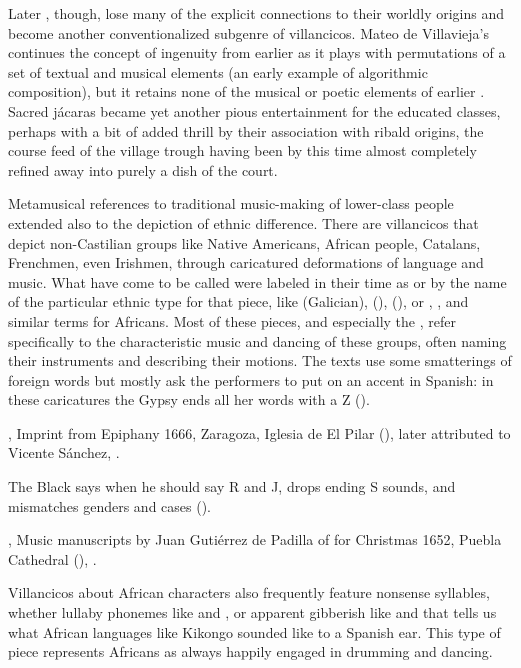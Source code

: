 Later , though, lose many of the explicit connections to their
worldly origins and become another conventionalized subgenre of villancicos.
Mateo de Villavieja's  continues the concept of
ingenuity from earlier  as it plays with permutations of a set of
textual and musical elements (an early example of algorithmic composition), but
it retains none of the musical or poetic elements of earlier .
Sacred jácaras became yet another pious entertainment for the educated classes,
perhaps with a bit of added thrill by their association with ribald origins,
the course feed of the village trough having been by this time almost
completely refined away into purely a dish of the court.

Metamusical references to traditional music-making of lower-class people
extended also to the depiction of ethnic difference.
There are villancicos that depict non-Castilian groups like Native Americans,
African people, Catalans, Frenchmen, even Irishmen, through caricatured
deformations of language and music.
What have come to be called  were labeled in their
time as  or by the name of the particular ethnic
type for that piece, like  (Galician), 
(),  (), or ,
, and similar terms for Africans.
Most of these pieces, and especially the , refer
specifically to the characteristic music and dancing of these groups, often
naming their instruments and describing their motions.
The texts use some smatterings of foreign words but mostly ask the performers
to put on an accent in Spanish: in these caricatures the Gypsy ends all her
words with a Z ().
\begin{Footnote}
    , Imprint from Epiphany 1666, Zaragoza,
    Iglesia de El Pilar (), later attributed to Vicente
    Sánchez, .
\end{Footnote}
The Black says when he should say R and J, drops ending S sounds, and
mismatches genders and cases ().%
\begin{Footnote}
    , Music manuscripts by Juan Gutiérrez de
    Padilla of  for Christmas 1652, Puebla Cathedral
    (), \XXX[WLSCM32].
\end{Footnote}
Villancicos about African characters also frequently feature nonsense
syllables, whether lullaby phonemes like  and , or apparent gibberish like  and
 that tells us what African languages like Kikongo
sounded like to a Spanish ear.%
This type of piece represents Africans as always happily engaged in drumming
and dancing.%

